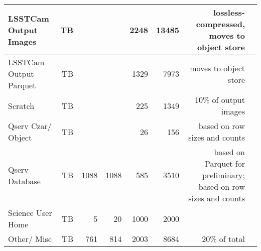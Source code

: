 \begin{longtable} { |p{}  |r  |r  |r  |r  |r  |r  |r |}
{LSSTCam Output Images}&{TB}&{}&{}&{2248}&{13485}&{lossless-compressed, moves to object store} \\ \hline
{LSSTCam Output Parquet}&{TB}&{}&{}&{1329}&{7973}&{moves to object store} \\ \hline
{Scratch}&{TB}&{}&{}&{225}&{1349}&{10\% of output images} \\ \hline
{Qserv Czar/ Object}&{TB}&{}&{}&{26}&{156}&{based on row sizes and counts} \\ \hline
{Qserv Database}&{TB}&{1088}&{1088}&{585}&{3510}&{based on Parquet for preliminary; based on row sizes and counts} \\ \hline
{Science User Home}&{TB}&{5}&{20}&{1000}&{2000}& \\ \hline
{Other/ Misc}&{TB}&{761}&{814}&{2003}&{8684}&{20\% of total} \\ \hline
\end{longtable} \normalsize

